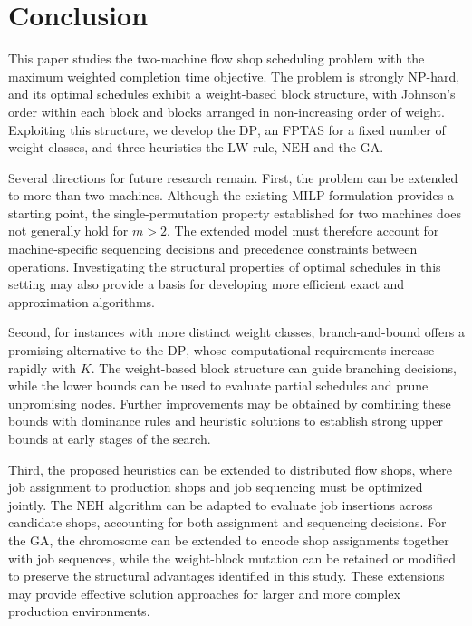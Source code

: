 ﻿\documentclass[12pt]{article} \textheight=24.5cm \textwidth=16.5cm \parskip = 0.165cm
\let\origsection\section
\renewcommand{\section}{\FloatBarrier\origsection}
\begin{document}
\begin{sloppypar}
        \section{Conclusion} \label{sec:conclusion}

        This paper studies the two-machine flow shop scheduling problem with the maximum weighted completion time objective.
        The problem is strongly NP-hard, and its optimal schedules exhibit a weight-based block structure, with Johnson's order within each block and blocks arranged in non-increasing order of weight.
        Exploiting this structure, we develop the $\mathrm{DP}$, an FPTAS for a fixed number of weight classes, and three heuristics  the $\mathrm{LW}$ rule, $\mathrm{NEH}$ and the $\mathrm{GA}$.

        Several directions for future research remain.
        First, the problem can be extended to more than two machines.
        Although the existing $\mathrm{MILP}$ formulation provides a starting point, the single-permutation property established for two machines does not generally hold for $m>2$.
        The extended model must therefore account for machine-specific sequencing decisions and precedence constraints between operations.
        Investigating the structural properties of optimal schedules in this setting may also provide a basis for developing more efficient exact and approximation algorithms.

        Second, for instances with more distinct weight classes, branch-and-bound offers a promising alternative to the $\mathrm{DP}$, whose computational requirements increase rapidly with $K$.
        The weight-based block structure can guide branching decisions, while the lower bounds can be used to evaluate partial schedules and prune unpromising nodes.
        Further improvements may be obtained by combining these bounds with dominance rules and heuristic solutions to establish strong upper bounds at early stages of the search.

        Third, the proposed heuristics can be extended to distributed flow shops, where job assignment to production shops and job sequencing must be optimized jointly.
        The $\mathrm{NEH}$ algorithm can be adapted to evaluate job insertions across candidate shops, accounting for both assignment and sequencing decisions.
        For the $\mathrm{GA}$, the chromosome can be extended to encode shop assignments together with job sequences, while the weight-block mutation can be retained or modified to preserve the structural advantages identified in this study.
        These extensions may provide effective solution approaches for larger and more complex production environments.

        
        

    \end{sloppypar}
\end{document}
